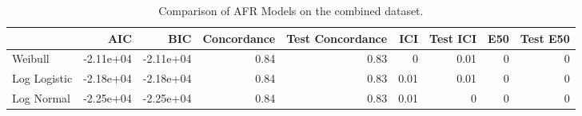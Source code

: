 \begin{table*}[ht]
\centering
\caption{Comparison of AFR Models on the combined dataset.}
\label{tab:combined}
\begin{tabular}{lrrrrrrrr}
\toprule
 & AIC & BIC & Concordance & Test Concordance & ICI & Test ICI & E50 & Test E50 \\
\midrule
Weibull & -2.11e+04 & -2.11e+04 & 0.84 & 0.83 & 0 & 0.01 & 0 & 0 \\
Log Logistic & -2.18e+04 & -2.18e+04 & 0.84 & 0.83 & 0.01 & 0.01 & 0 & 0 \\
Log Normal & -2.25e+04 & -2.25e+04 & 0.84 & 0.83 & 0.01 & 0 & 0 & 0 \\
\bottomrule
\end{tabular}
\end{table*}
